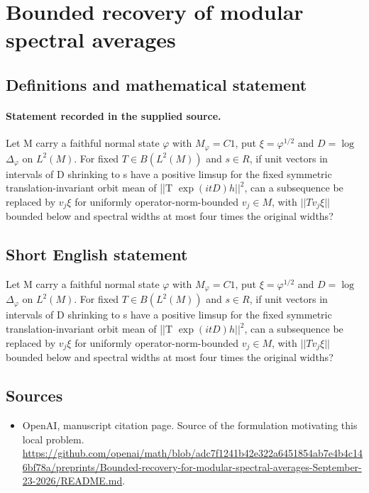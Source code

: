\documentclass[11pt]{article}
\begin{document}
\section*{Bounded recovery of modular spectral averages}\label{statement}
\subsection{Definitions and mathematical statement}
\paragraph{Statement recorded in the supplied source.}
Let M carry a faithful normal state $\varphi $ with $M_\varphi =C1$, put $\xi =\varphi ^{1/2}$ and $D=\log $ $\Delta _\varphi $ on $L^{2}(M)$. For fixed $T\in B(L^{2}(M))$ and $s\in R$, if unit vectors in intervals of D shrinking to s have a positive limsup for the fixed symmetric translation-invariant orbit mean of ||T $\exp (itD)h||^{2}$, can a subsequence be replaced by $v_j\xi $ for uniformly operator-norm-bounded $v_j\in M$, with $||Tv_j\xi ||$ bounded below and spectral widths at most four times the original widths?
\subsection{Short English statement}
Let M carry a faithful normal state $\varphi $ with $M_\varphi =C1$, put $\xi =\varphi ^{1/2}$ and $D=\log $ $\Delta _\varphi $ on $L^{2}(M)$. For fixed $T\in B(L^{2}(M))$ and $s\in R$, if unit vectors in intervals of D shrinking to s have a positive limsup for the fixed symmetric translation-invariant orbit mean of ||T $\exp (itD)h||^{2}$, can a subsequence be replaced by $v_j\xi $ for uniformly operator-norm-bounded $v_j\in M$, with $||Tv_j\xi ||$ bounded below and spectral widths at most four times the original widths?
\subsection{Sources}
\begin{itemize}
\item[S1] OpenAI, manuscript citation page. Source of the formulation motivating this local problem.
\url{https://github.com/openai/math/blob/adc7f1241b42e322a6451854ab7e4b4c146bf78a/preprints/Bounded-recovery-for-modular-spectral-averages-September-23-2026/README.md}.
\end{itemize}
\end{document}
